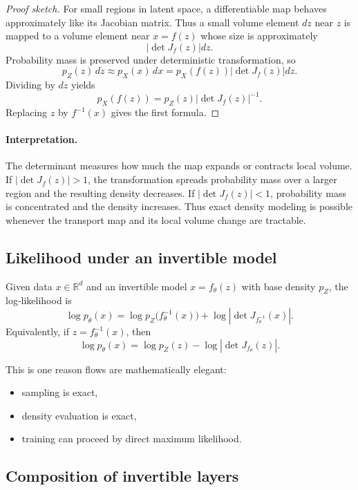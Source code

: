 \begin{proof}[Proof sketch]
For small regions in latent space, a differentiable map behaves approximately like its Jacobian matrix.
Thus a small volume element $dz$ near $z$ is mapped to a volume element near $x=f(z)$ whose size is approximately
\[
\left|\det J_f(z)\right|dz.
\]
Probability mass is preserved under deterministic transformation, so
\[
p_Z(z)\,dz \approx p_X(x)\,dx = p_X(f(z))\left|\det J_f(z)\right|dz.
\]
Dividing by $dz$ yields
\[
p_X(f(z)) = p_Z(z)\left|\det J_f(z)\right|^{-1}.
\]
Replacing $z$ by $f^{-1}(x)$ gives the first formula.
\end{proof}

\paragraph{Interpretation.}
The determinant measures how much the map expands or contracts local volume.
If $|\det J_f(z)|>1$, the transformation spreads probability mass over a larger region and the resulting density decreases.
If $|\det J_f(z)|<1$, probability mass is concentrated and the density increases.
Thus exact density modeling is possible whenever the transport map and its local volume change are tractable.

\subsection*{Likelihood under an invertible model}

Given data $x\in\mathbb{R}^d$ and an invertible model $x=f_\theta(z)$ with base density $p_Z$, the log-likelihood is
\[
\log p_\theta(x)
=
\log p_Z\bigl(f_\theta^{-1}(x)\bigr)
+
\log\left|\det J_{f_\theta^{-1}}(x)\right|.
\]
Equivalently, if $z=f_\theta^{-1}(x)$, then
\[
\log p_\theta(x)
=
\log p_Z(z)-\log\left|\det J_{f_\theta}(z)\right|.
\]

This is one reason flows are mathematically elegant:
\begin{itemize}
    \item sampling is exact,
    \item density evaluation is exact,
    \item training can proceed by direct maximum likelihood.
\end{itemize}

\subsection*{Composition of invertible layers}

